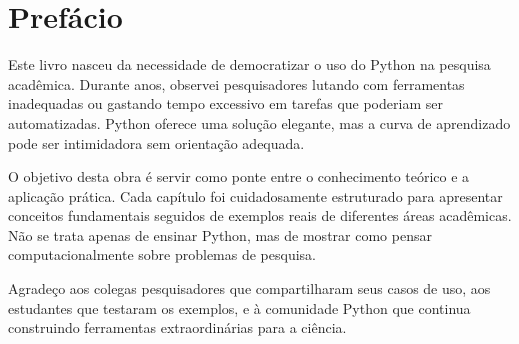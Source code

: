 \chapter*{Prefácio}

Este livro nasceu da necessidade de democratizar o uso do Python na pesquisa acadêmica. Durante anos, observei pesquisadores lutando com ferramentas inadequadas ou gastando tempo excessivo em tarefas que poderiam ser automatizadas. Python oferece uma solução elegante, mas a curva de aprendizado pode ser intimidadora sem orientação adequada.

O objetivo desta obra é servir como ponte entre o conhecimento teórico e a aplicação prática. Cada capítulo foi cuidadosamente estruturado para apresentar conceitos fundamentais seguidos de exemplos reais de diferentes áreas acadêmicas. Não se trata apenas de ensinar Python, mas de mostrar como pensar computacionalmente sobre problemas de pesquisa.

Agradeço aos colegas pesquisadores que compartilharam seus casos de uso, aos estudantes que testaram os exemplos, e à comunidade Python que continua construindo ferramentas extraordinárias para a ciência.


\cleardoublepage   %
